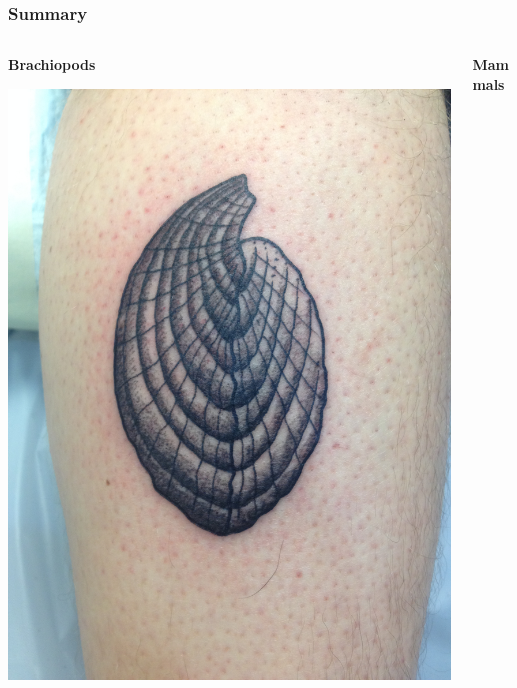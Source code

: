 \documentclass{beamer}
\begin{document}
\begin{frame}
  \frametitle{Summary}
  \begin{columns}
    \begin{column}{0.5\textwidth}
      \begin{center}
        \textbf{Brachiopods}
        
        \vspace{0.5cm}

        \includegraphics[height = 0.555\textheight, keepaspectratio = true]{figure/tattoo}
      \end{center}
    \end{column}
    \begin{column}{0.5\textwidth}
      \begin{center}
        \textbf{Mammals}

        \vspace{0.5cm}


\end{center}
\end{column}
\end{columns}
\end{frame}
\end{document}
